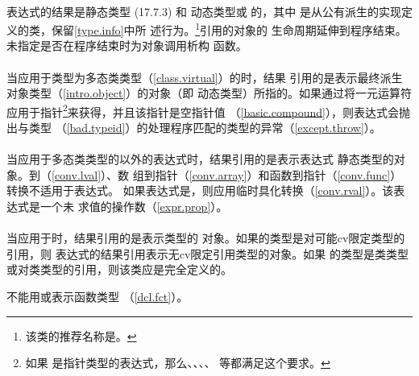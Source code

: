 \paragraph{} %
表达式的结果是静态类型 (17.7.3) 和
动态类型或 的\lvalue{}，其中
是从公有派生的实现定义的类，保留\ref{type.info}中所
述行为。\footnote{该类的推荐名称是。}\lvalue{}引用的对象的
生命周期延伸到程序结束。未指定是否在程序结束时为对象调用析构
函数。

\paragraph{} %
当应用于类型为多态类类型（\ref{class.virtual}）的\glvalue{}时，结果
引用的是表示最终派生对象类型（\ref{intro.object}）的对象（即
动态类型）\glvalue{}所指的。如果通过将一元\tm{*}运算符应用于指针\footnote{如果
是指针类型的表达式，那么、、、、
等都满足这个要求。}来获得\glvalue{}，并且该指针是空指针值
（\ref{basic.compound}），则表达式会抛出与类型
（\ref{bad.typeid}）的处理程序匹配的类型的异常（\ref{except.throw}）。

\paragraph{} %
当应用于多态类类型的\glvalue{}以外的表达式时，结果引用的是表示表达式
静态类型的对象。\lvalue{}到\rvalue{}（\ref{conv.lval}）、数
组到指针（\ref{conv.array}）和函数到指针（\ref{conv.func}）转换不适用于表达式。
如果表达式是\prvalue{}，则应用临时具化转换（\ref{conv.rval}）。该表达式是一个未
求值的操作数（\ref{expr.prop}）。

\paragraph{} %
当应用于时，结果引用的是表示类型的
对象。如果的类型是对可能cv限定类型的引用，则
表达式的结果引用表示无cv限定引用类型的对象。如果
的类型是类类型或对类类型的引用，则该类应是完全定义的。

\begin{note}
  不能用或表示函数类型
  （\ref{dcl.fct}）。
\end{note}

